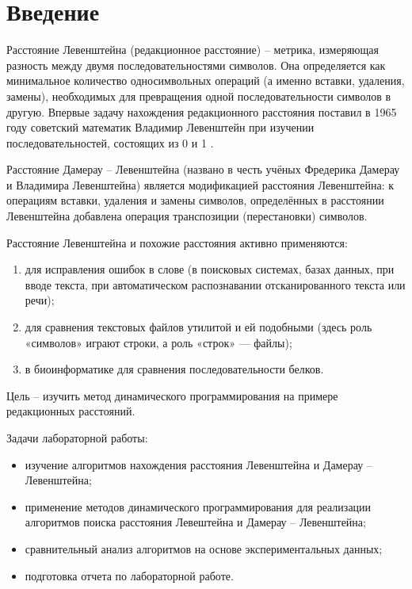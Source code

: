 \chapter*{Введение}

Расстояние Левенштейна (редакционное расстояние) -- метрика, измеряющая разность между двумя последовательностями символов. Она определяется как минимальное количество односимвольных операций (а именно вставки, удаления, замены), необходимых для превращения одной последовательности символов в другую. Впервые задачу нахождения редакционного расстояния поставил в 1965 году советский математик Владимир Левенштейн при изучении последовательностей, состоящих из  0 и 1 \cite{bib1}.

Расстояние Дамерау -- Левенштейна (названо в честь учёных Фредерика Дамерау и Владимира Левенштейна) является модификацией расстояния Левенштейна: к операциям вставки, удаления и замены символов, определённых в расстоянии Левенштейна добавлена операция транспозиции (перестановки) символов.

Расстояние Левенштейна и похожие расстояния активно применяются: 
\begin{enumerate}[label={\arabic*)}]
	\item для исправления ошибок в слове (в поисковых системах, базах данных, при вводе текста, при автоматическом распознавании отсканированного текста или речи);
	\item для сравнения текстовых файлов утилитой  и ей подобными (здесь роль «символов» играют строки, а роль «строк» — файлы);
	\item в биоинформатике для сравнения последовательности белков.
\end{enumerate}

Цель -- изучить метод динамического программирования на примере редакционных расстояний.

Задачи лабораторной работы:

\begin{itemize}
	\item изучение алгоритмов нахождения расстояния Левенштейна и Дамерау -- Левенштейна;
	\item применение методов динамического программирования для реализации алгоритмов поиска расстояния Левештейна и Дамерау -- Левенштейна;
	\item сравнительный анализ алгоритмов на основе экспериментальных данных;
	\item подготовка отчета по лабораторной работе.
\end{itemize}
